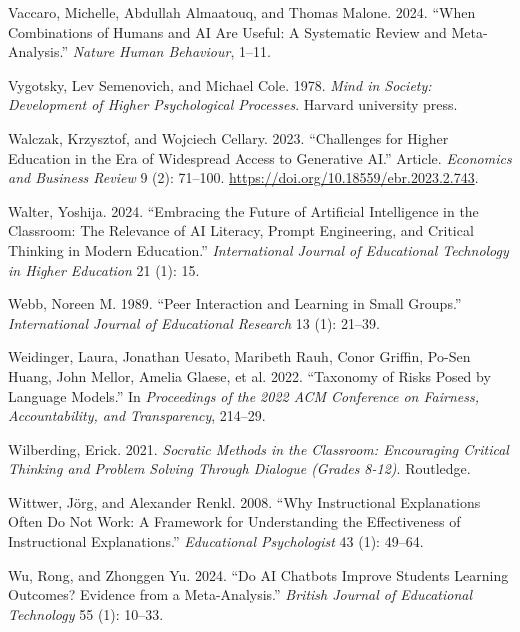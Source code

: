 \documentclass[
  11pt,
]{article}
\newlength{\cslhangindent}
\newenvironment{CSLReferences}[2] %
 {\begin{list}{}{%
  \setlength{\itemindent}{0pt}
  \setlength{\leftmargin}{0pt}
  \setlength{\parsep}{0pt}
  \ifodd #1
   \setlength{\leftmargin}{\cslhangindent}
   \setlength{\itemindent}{-1\cslhangindent}
  \fi
  \setlength{\itemsep}{#2\baselineskip}}}
 {\end{list}}
\begin{document}
\begin{CSLReferences}{1}{0}
Vaccaro, Michelle, Abdullah Almaatouq, and Thomas Malone. 2024. {``When Combinations of Humans and AI Are Useful: A Systematic Review and Meta-Analysis.''} \emph{Nature Human Behaviour}, 1--11.

Vygotsky, Lev Semenovich, and Michael Cole. 1978. \emph{Mind in Society: Development of Higher Psychological Processes}. Harvard university press.

Walczak, Krzysztof, and Wojciech Cellary. 2023. {``Challenges for Higher Education in the Era of Widespread Access to Generative AI.''} Article. \emph{Economics and Business Review} 9 (2): 71--100. \url{https://doi.org/10.18559/ebr.2023.2.743}.

Walter, Yoshija. 2024. {``Embracing the Future of Artificial Intelligence in the Classroom: The Relevance of AI Literacy, Prompt Engineering, and Critical Thinking in Modern Education.''} \emph{International Journal of Educational Technology in Higher Education} 21 (1): 15.

Webb, Noreen M. 1989. {``Peer Interaction and Learning in Small Groups.''} \emph{International Journal of Educational Research} 13 (1): 21--39.

Weidinger, Laura, Jonathan Uesato, Maribeth Rauh, Conor Griffin, Po-Sen Huang, John Mellor, Amelia Glaese, et al. 2022. {``Taxonomy of Risks Posed by Language Models.''} In \emph{Proceedings of the 2022 ACM Conference on Fairness, Accountability, and Transparency}, 214--29.

Wilberding, Erick. 2021. \emph{Socratic Methods in the Classroom: Encouraging Critical Thinking and Problem Solving Through Dialogue (Grades 8-12)}. Routledge.

Wittwer, Jörg, and Alexander Renkl. 2008. {``Why Instructional Explanations Often Do Not Work: A Framework for Understanding the Effectiveness of Instructional Explanations.''} \emph{Educational Psychologist} 43 (1): 49--64.

Wu, Rong, and Zhonggen Yu. 2024. {``Do AI Chatbots Improve Students Learning Outcomes? Evidence from a Meta-Analysis.''} \emph{British Journal of Educational Technology} 55 (1): 10--33.


\end{CSLReferences}
\end{document}
